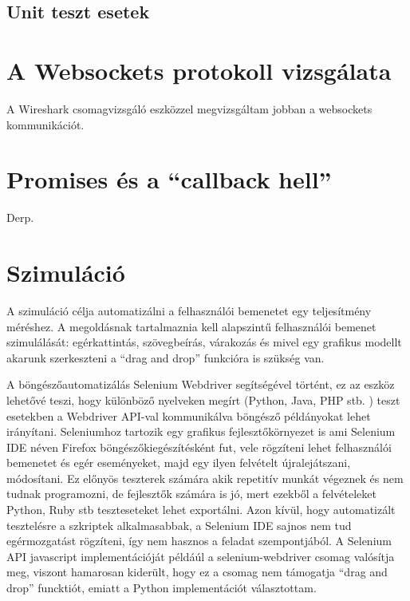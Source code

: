 \subsection{Unit teszt esetek}







\section{A Websockets protokoll vizsgálata}

A Wireshark csomagvizsgáló eszközzel megvizsgáltam jobban a websockets kommunikációt.  




\section{Promises és a ``callback hell''}
Derp.


\section{Szimuláció}
A szimuláció célja automatizálni a felhasználói bemenetet egy teljesítmény méréshez. A megoldásnak tartalmaznia kell alapszintű felhasználói bemenet szimulálását: egérkattintás, szövegbeírás, várakozás és mivel egy grafikus modellt akarunk szerkeszteni a ``drag and drop'' funkcióra is szükség van. 

A böngészőautomatizálás Selenium Webdriver segítségével történt, ez az eszköz lehetővé teszi, hogy különböző nyelveken megírt (Python, Java, PHP stb. ) teszt esetekben a Webdriver API-val kommunikálva böngésző példányokat lehet irányítani. 
Seleniumhoz tartozik egy grafikus fejlesztőkörnyezet is ami Selenium IDE néven Firefox böngészőkiegészítésként fut, vele rögzíteni lehet felhasználói bemenetet és egér eseményeket, majd egy ilyen felvételt újralejátszani, módosítani. Ez előnyös teszterek számára akik repetitív munkát végeznek és nem tudnak programozni, de fejlesztők számára is jó, mert ezekből a felvételeket Python, Ruby stb teszteseteket lehet exportálni. 
Azon kívül, hogy automatizált tesztelésre a szkriptek alkalmasabbak, a Selenium IDE sajnos nem tud egérmozgatást rögzíteni, így nem hasznos a feladat szempontjából. A Selenium API javascript implementációját példáúl a selenium-webdriver csomag valósítja meg, viszont hamarosan kiderült, hogy ez a csomag nem támogatja ``drag and drop'' funcktiót, emiatt a Python implementációt választottam. 
